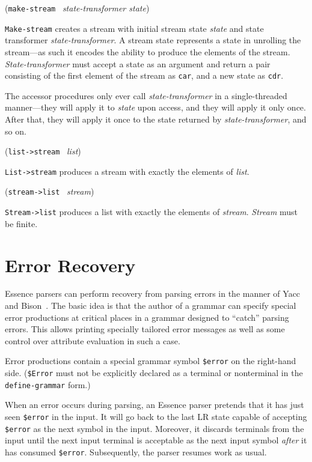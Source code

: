 \documentclass{article}
\renewcommand{\var}[1]{\noindent\mbox{\textit{#1}}}
\newcommand{\ide}[1]{{\frenchspacing\textnormal{\texttt{#1}}}}
\newcommand{\pproto}[2]{\unskip%
\mbox{\texonly{\spaceskip=0.5em}#1}%
\mbox{ }\texonly{\nobreak}\htmlonly{ }\textrm{#2}}
\newcommand{\proto}[3]{\par\bigskip\begin{flushleft}\pproto{(\texttt{#1}}{\textit{#2})}\hspace*{\fill}{#3}\end{flushleft}}
\newcommand{\codefont}[1]{\texttt{#1}}
\begin{document}
\proto{make-stream}{state-transformer state}{procedure}
%
\ide{Make-stream} creates a stream with initial stream state
\var{state} and state transformer \var{state-transformer}.  A stream
state represents a state in unrolling the stream---as such it encodes
the ability to produce the elements of the stream.
\var{State-transformer} must accept a state as an argument and return
a pair consisting of the first element of the stream as
\codefont{car}, and a new state as \codefont{cdr}.

The accessor procedures only ever call \var{state-transformer} in a
single-threaded manner---they will apply it to \var{state} upon
access, and they will apply it only once.  After that, they will apply 
it once to the state returned by \var{state-transformer}, and so on.

\proto{list->stream}{list}{procedure}
%
\ide{List->stream} produces a stream with exactly the elements of
\var{list}.

\proto{stream->list}{stream}{procedure}
%
\ide{Stream->list} produces a list with exactly the elements of
\var{stream}.  \var{Stream} must be finite.

\section{Error Recovery}
\label{sec:error-recovery}

Essence parsers can perform recovery from parsing errors in the manner
of Yacc~\cite{Johnson1975} and Bison~\cite{DonnellyStallman1995}.  The
basic idea is that the author of a grammar can specify special
error productions at critical places in a grammar designed to ``catch''
parsing errors.  This allows printing specially tailored error
messages as well as some control over attribute evaluation in such a
case.

Error productions contain a special grammar symbol \codefont{\$error}
on the right-hand side.  (\codefont{\$Error} must not be explicitly
declared as a terminal or nonterminal in the \codefont{define-grammar}
form.)

When an error occurs during parsing, an Essence parser pretends that
it has just seen \codefont{\$error} in the input.  It will go back to
the last LR state capable of accepting \codefont{\$error} as the next
symbol in the input.  Moreover, it discards terminals from the input
until the next input terminal is acceptable as the next input symbol
\emph{after} it has consumed \codefont{\$error}.  Subsequently, the
parser resumes work as usual.
\end{document}
